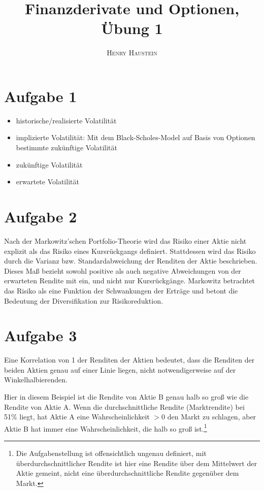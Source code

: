 \documentclass{article}
\title{\textbf{Finanzderivate und Optionen, Übung 1}}
\author{\textsc{Henry Haustein}}
\date{}
\begin{document}
	\maketitle
	
	\section*{Aufgabe 1}
	\begin{itemize}
		\item historische/realisierte Volatilität
		\item implizierte Volatilität: Mit dem Black-Scholes-Model auf Basis von Optionen bestimmte zukünftige Volatilität
		\item zukünftige Volatilität
		\item erwartete Volatilität
	\end{itemize}

	\section*{Aufgabe 2}
	Nach der Markowitz'schen Portfolio-Theorie wird das Risiko einer Aktie nicht explizit als das Risiko eines Kursrückgangs definiert. Stattdessen wird das Risiko durch die Varianz bzw. Standardabweichung der Renditen der Aktie beschrieben. Dieses Maß bezieht sowohl positive als auch negative Abweichungen von der erwarteten Rendite mit ein, und nicht nur Kursrückgänge. Markowitz betrachtet das Risiko als eine Funktion der Schwankungen der Erträge und betont die Bedeutung der Diversifikation zur Risikoreduktion.
	
	\section*{Aufgabe 3}
	Eine Korrelation von 1 der Renditen der Aktien bedeutet, dass die Renditen der beiden Aktien genau auf einer Linie liegen, nicht notwendigerweise auf der Winkelhalbierenden.
	\begin{center}
	\end{center}
	Hier in diesem Beispiel ist die Rendite von Aktie B genau halb so groß wie die Rendite von Aktie A. Wenn die durchschnittliche Rendite (Marktrendite) bei 51\% liegt, hat Aktie A eine Wahrscheinlichkeit $>0$ den Markt zu schlagen, aber Aktie B hat immer eine Wahrscheinlichkeit, die halb so groß ist.\footnote{Die Aufgabenstellung ist offensichtlich ungenau definiert, mit überdurchschnittlicher Rendite ist hier eine Rendite über dem Mittelwert der Aktie gemeint, nicht eine überdurchschnittliche Rendite gegenüber dem Markt.}
	
\end{document}
